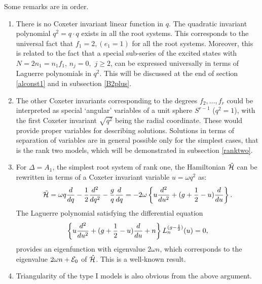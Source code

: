 \documentclass[a4paper,12pt]{article}
\begin{document}
\bigskip
Some remarks are in order.
\begin{enumerate}
\item
  There is no Coxeter invariant linear
  function in \(q\).
  The quadratic invariant polynomial \(q^2=q\cdot q\) exists in all the
  root systems. This corresponds to the universal fact that
  \(f_1=2, (e_1=1)\) for all the root systems.
  Moreover, this is related to the fact that a special sub-series of
  the excited states with \(N=2n_1=n_1f_1\), \(n_j=0,\) \(j\ge2\), can be
  expressed universally in terms of Laguerre polynomials in \(q^2\).
  This will be discussed at the end of section \ref{alconst1} and in
  subsection
  \ref{B2plus}.
\item
  The other Coxeter invariants corresponding to the degrees
\(f_2,\ldots,f_r\)
  could be interpreted as special  `angular' variables of a unit sphere
  \(S^{r-1}\) (\(q^2=1\)), with the first Coxeter
invariant \(\sqrt{q^2}\) being the
  radial coordinate.
  These would provide proper variables for describing solutions.
  Solutions in terms of
  separation of variables are in general possible only for the simplest
  cases, that is the rank two models, which will be demonstrated in
  subsection \ref{ranktwo}.
\item
  For \(\Delta=A_1\), the simplest root system of rank one, the Hamiltonian
  \(\tilde{\cal H}\) can be rewritten in terms of a Coxeter invariant
variable
  \(u=\omega q^2\) as:
  \begin{equation}
     \tilde{\cal H}=\omega
     q{d\over{dq}}-{1\over2}{d^2\over{dq^2}}-{g\over{q}}{d\over{dq}}
=-2\omega\left\{u{d^2\over{du^2}}+(g+{1\over2}-u){d\over{du}}\right\}.
     \end{equation}
     The Laguerre polynomial satisfying the differential equation
     \begin{equation}
     \left\{u{d^2\over{du^2}}+(g+{1\over2}-u){d\over{du}}+n\right\}
    L_n^{(g-{1\over2})}(u)=0,
     \label{lagueeq}
  \end{equation}
  provides an eigenfunction with eigenvalue \(2\omega n\), which corresponds
  to the eigenvalue \(2\omega n+{\cal E}_0\) of \(\hat{\cal H}\).
  This is a well-known result.
\item
  Triangularity of the type I models is also obvious from the above
  argument.
\end{enumerate}
\end{document}
